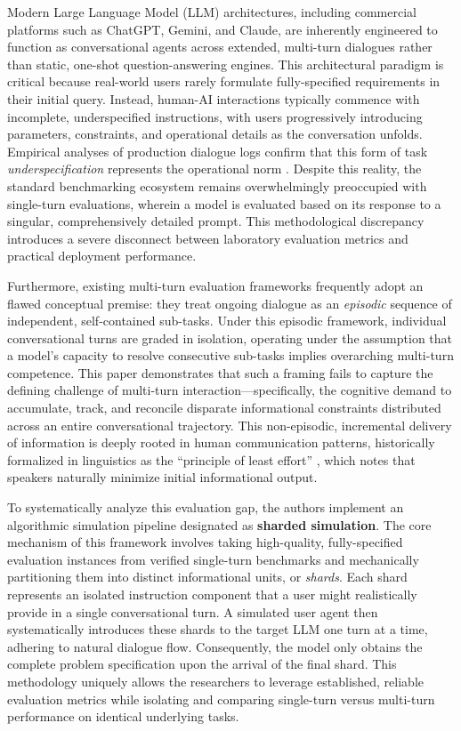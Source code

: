 \documentclass[manuscript,review]{acmart}
\begin{document}
Modern Large Language Model (LLM) architectures, including commercial platforms such as ChatGPT, Gemini, and Claude, are inherently engineered to function as conversational agents across extended, multi-turn dialogues rather than static, one-shot question-answering engines. This architectural paradigm is critical because real-world users rarely formulate fully-specified requirements in their initial query. Instead, human-AI interactions typically commence with incomplete, underspecified instructions, with users progressively introducing parameters, constraints, and operational details as the conversation unfolds. Empirical analyses of production dialogue logs confirm that this form of task \emph{underspecification} represents the operational norm \cite{herlihy2024overcoming}. Despite this reality, the standard benchmarking ecosystem remains overwhelmingly preoccupied with single-turn evaluations, wherein a model is evaluated based on its response to a singular, comprehensively detailed prompt. This methodological discrepancy introduces a severe disconnect between laboratory evaluation metrics and practical deployment performance.

Furthermore, existing multi-turn evaluation frameworks frequently adopt an flawed conceptual premise: they treat ongoing dialogue as an \emph{episodic} sequence of independent, self-contained sub-tasks. Under this episodic framework, individual conversational turns are graded in isolation, operating under the assumption that a model's capacity to resolve consecutive sub-tasks implies overarching multi-turn competence. This paper demonstrates that such a framing fails to capture the defining challenge of multi-turn interaction—specifically, the cognitive demand to accumulate, track, and reconcile disparate informational constraints distributed across an entire conversational trajectory. This non-episodic, incremental delivery of information is deeply rooted in human communication patterns, historically formalized in linguistics as the ``principle of least effort'' \cite{zipf1949human}, which notes that speakers naturally minimize initial informational output.

To systematically analyze this evaluation gap, the authors implement an algorithmic simulation pipeline designated as \textbf{sharded simulation}. The core mechanism of this framework involves taking high-quality, fully-specified evaluation instances from verified single-turn benchmarks and mechanically partitioning them into distinct informational units, or \emph{shards}. Each shard represents an isolated instruction component that a user might realistically provide in a single conversational turn. A simulated user agent then systematically introduces these shards to the target LLM one turn at a time, adhering to natural dialogue flow. Consequently, the model only obtains the complete problem specification upon the arrival of the final shard. This methodology uniquely allows the researchers to leverage established, reliable evaluation metrics while isolating and comparing single-turn versus multi-turn performance on identical underlying tasks.
\end{document}
